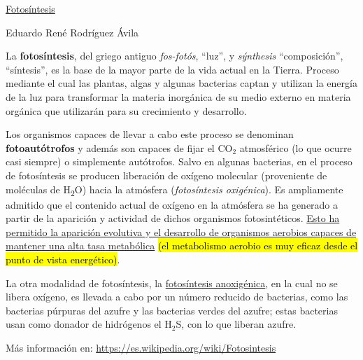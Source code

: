 \documentclass[10pt,letterpaper]{article}
\author{Tu nombre}
\begin{document}
	\begin{center}
\underline{{\huge Fotosíntesis}}

Eduardo René Rodríguez Ávila
\end{center}

La \textbf{fotosíntesis}, del griego antiguo \textit{fos-fotós}, ``luz'', y \textit{sýnthesis} ``composición'', ``síntesis'', es la base de la mayor parte de la vida actual en la Tierra. Proceso mediante el cual las plantas, algas y algunas bacterias captan y utilizan la energía de la luz para transformar la materia inorgánica de su medio externo en materia orgánica que utilizarán para su crecimiento y desarrollo.

Los organismos capaces de llevar a cabo este proceso se denominan \textbf{fo\-to\-au\-tó\-tro\-fos} y además son capaces de fijar el CO$_{2}$ atmosférico (lo que ocurre casi siempre) o simplemente autótrofos. Salvo en algunas bacterias, en el proceso de fotosíntesis se producen liberación de oxígeno molecular (proveniente de moléculas de H\textsubscript{2}O) hacia la atmósfera (\textit{fotosíntesis oxigénica}). Es ampliamente admitido que el contenido actual de oxígeno en la atmósfera se ha generado a partir de la aparición y actividad de dichos organismos fotosintéticos. \ul{Esto ha permitido la aparición evolutiva y el desarrollo de organismos aerobios capaces de mantener una alta tasa metabólica} \hl{(el metabolismo aerobio es muy eficaz desde el punto de vista energético)}.

La otra modalidad de fotosíntesis, la \ul{fotosíntesis anoxigénica}, en la cual no se libera oxígeno, es llevada a cabo por un número reducido de bacterias, como las bacterias púrpuras del azufre y las bacterias verdes del azufre; estas bacterias usan como donador de hidrógenos el H$_2$S, con lo que liberan azufre.

Más información en: \url{https://es.wikipedia.org/wiki/Fotosintesis}
\end{document}
